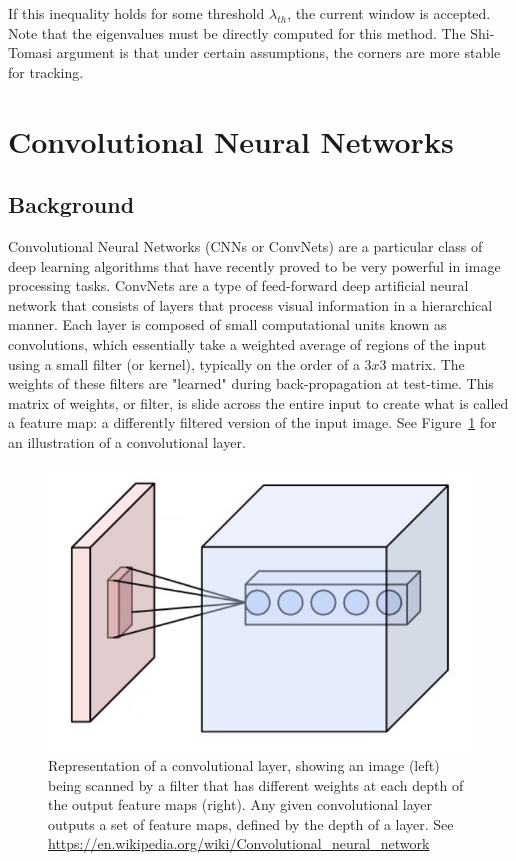 \documentclass[hidelinks]{article}
\begin{document}
If this inequality holds for some threshold $\lambda_{th}$, the current window is accepted. Note that the eigenvalues must be directly computed for this method. The Shi-Tomasi argument is that under certain assumptions, the corners are more stable for tracking.


\section{Convolutional Neural Networks}\label{sec:CNN}

\subsection{Background}
Convolutional Neural Networks (CNNs or ConvNets) are a particular class of deep learning algorithms that have recently proved to be very powerful in image processing tasks. ConvNets are a type of feed-forward deep artificial neural network that consists of layers that process visual information in a hierarchical manner. Each layer is composed of small computational units known as convolutions, which essentially take a weighted average of regions of the input using a small filter (or kernel), typically on the order of a $3x3$ matrix. The weights of these filters are "learned" during back-propagation at test-time. This matrix of weights, or filter, is slide across the entire input to create what is called a feature map: a differently filtered version of the input image. See Figure~\ref{fig:conv_layer} for an illustration of a convolutional layer.

\begin{figure}[H]
  \centering
  \includegraphics[scale=0.35]{conv_layer}
  \caption{Representation of a convolutional layer, showing an image (left) being scanned by a filter that has different weights at each depth of the output feature maps (right). Any given convolutional layer outputs a set of feature maps, defined by the depth of a layer. See \url{https://en.wikipedia.org/wiki/Convolutional_neural_network}}
  \label{fig:conv_layer}
\end{figure}
\end{document}
